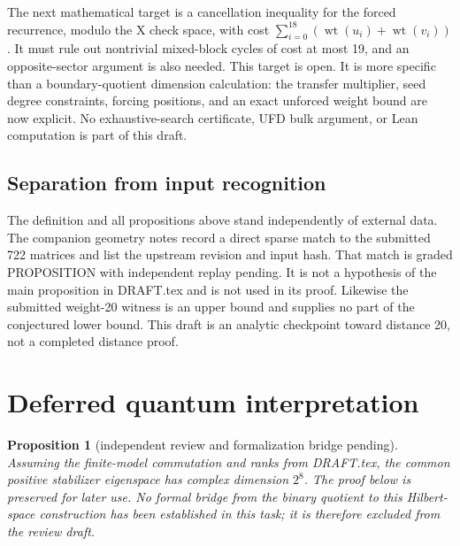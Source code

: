 \documentclass{article}
\newtheorem*{proposition*}{Proposition}
\DeclareMathOperator{\wt}{wt}
\begin{document}
The next mathematical target is a cancellation inequality for the forced recurrence,
modulo the X check space, with cost \(\sum_{i=0}^{18} (\wt(u_i) + \wt(v_i))\). It must
rule out nontrivial mixed-block cycles of cost at most 19, and an opposite-sector argument
is also needed. This target is open. It is more specific than a boundary-quotient
dimension calculation: the transfer multiplier, seed degree constraints, forcing
positions, and an exact unforced weight bound are now explicit. No exhaustive-search
certificate, UFD bulk argument, or Lean computation is part of this draft.

\subsection{Separation from input recognition}\label{sec:separation}

The definition and all propositions above stand independently of external data. The
companion geometry notes record a direct sparse match to the submitted 722 matrices and
list the upstream revision and input hash. That match is graded PROPOSITION with
independent replay pending. It is not a hypothesis of the main proposition in DRAFT.tex
and is not used in its proof. Likewise the submitted weight-20 witness is an upper bound
and supplies no part of the conjectured lower bound. This draft is an analytic checkpoint
toward distance 20, not a completed distance proof.

\section{Deferred quantum interpretation}\label{sec:quantum}

\begin{proposition*}[independent review and formalization bridge pending]
  Assuming the finite-model commutation and ranks from DRAFT.tex, the common positive
  stabilizer eigenspace has complex dimension \(2^8\). The proof below is preserved for
  later use. No formal bridge from the binary quotient to this Hilbert-space construction
  has been established in this task; it is therefore excluded from the review draft.
\end{proposition*}
\end{document}
